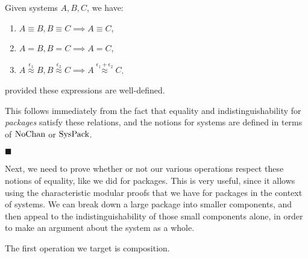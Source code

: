 \begin{lemma}
  \label{thm:system_trans}
  Given systems $A, B, C$, we have:
  \begin{enumerate}
    \item $A \equiv B, B \equiv C \implies A \equiv C$,
    \item $A = B, B = C \implies A = C$,
    \item $A \overset{\epsilon_1}{\approx} B, B \overset{\epsilon_2}{\approx} C \implies A \overset{\epsilon_1 + \epsilon_2}{\approx} C$.
  \end{enumerate}
  provided these expressions are well-defined.

   This follows immediately from the fact that equality and indistinguishability
  for \emph{packages} satisfy these relations, and the notions for systems are
  defined in terms of $\text{NoChan}$ or $\text{SysPack}$.

  $\blacksquare$
\end{lemma}

Next, we need to prove whether or not our various operations respect
these notions of equality, like we did for packages.
This is very useful, since it allows using the characteristic
modular proofs that we have for packages in the context of systems.
We can break down a large package into smaller components,
and then appeal to the indistinguishability of those small
components alone, in order to make an argument about the system
as a whole.

The first operation we target is composition.

